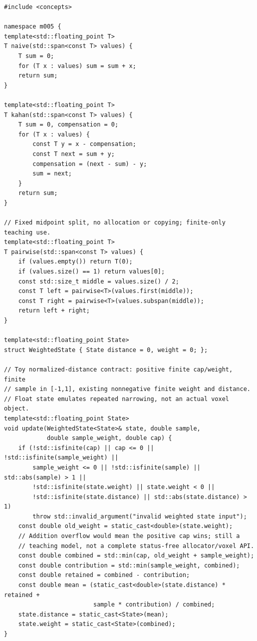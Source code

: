 \begin{verbatim}
#include <concepts>

namespace m005 {
template<std::floating_point T>
T naive(std::span<const T> values) {
    T sum = 0;
    for (T x : values) sum = sum + x;
    return sum;
}

template<std::floating_point T>
T kahan(std::span<const T> values) {
    T sum = 0, compensation = 0;
    for (T x : values) {
        const T y = x - compensation;
        const T next = sum + y;
        compensation = (next - sum) - y;
        sum = next;
    }
    return sum;
}

// Fixed midpoint split, no allocation or copying; finite-only teaching use.
template<std::floating_point T>
T pairwise(std::span<const T> values) {
    if (values.empty()) return T(0);
    if (values.size() == 1) return values[0];
    const std::size_t middle = values.size() / 2;
    const T left = pairwise<T>(values.first(middle));
    const T right = pairwise<T>(values.subspan(middle));
    return left + right;
}

template<std::floating_point State>
struct WeightedState { State distance = 0, weight = 0; };

// Toy normalized-distance contract: positive finite cap/weight, finite
// sample in [-1,1], existing nonnegative finite weight and distance.
// Float state emulates repeated narrowing, not an actual voxel object.
template<std::floating_point State>
void update(WeightedState<State>& state, double sample,
            double sample_weight, double cap) {
    if (!std::isfinite(cap) || cap <= 0 || !std::isfinite(sample_weight) ||
        sample_weight <= 0 || !std::isfinite(sample) || std::abs(sample) > 1 ||
        !std::isfinite(state.weight) || state.weight < 0 ||
        !std::isfinite(state.distance) || std::abs(state.distance) > 1)
        throw std::invalid_argument("invalid weighted state input");
    const double old_weight = static_cast<double>(state.weight);
    // Addition overflow would mean the positive cap wins; still a
    // teaching model, not a complete status-free allocator/voxel API.
    const double combined = std::min(cap, old_weight + sample_weight);
    const double contribution = std::min(sample_weight, combined);
    const double retained = combined - contribution;
    const double mean = (static_cast<double>(state.distance) * retained +
                         sample * contribution) / combined;
    state.distance = static_cast<State>(mean);
    state.weight = static_cast<State>(combined);
}


\end{verbatim}
